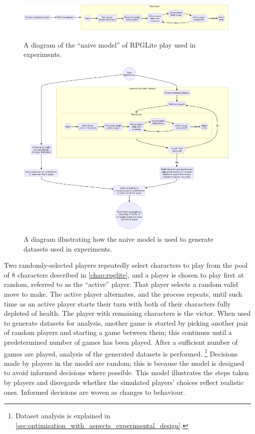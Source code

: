 \begin{figure}[tp]
  \centering
  \includegraphics[width=\columnwidth]{60_optimisation_with_aspects/diagrams/naive_model.png}
  \caption{A diagram of the ``naive model'' of RPGLite play used in experiments.}
  \label{fig:naive_model}

  \includegraphics[width=\columnwidth]{60_optimisation_with_aspects/diagrams/experiment_setup_for_datagen.png}
  \caption{A diagram illustrating how the naive model is used to generate datasets used in experiments.}
  \label{fig:naive_model_with_experimental_apparatus}
\end{figure}



Two randomly-selected players repeatedly select characters to play from the pool
of 8 characters described in \cref{chap:rpglite}, and a player is chosen to play
first at random, referred to as the ``active'' player. That player selects a
random valid move to make. The active player alternates, and the process
repeats, until such time as an active player starts their turn with both of
their characters fully depleted of health. The player with remaining characters
is the victor. When used to generate datasets for analysis, another game is
started by picking another pair of random players and starting a game between
them; this continues until a predetermined number of games has been played.
After a sufficient number of games are played, analysis of the generated datasets
is performed. \footnote{Dataset analysis is explained in
\cref{sec:optimisation_with_aspects_experimental_design}.}
Decisions made by players in the model are random; this is because the model is
designed to avoid informed decisions where possible. This model illustrates the
steps taken by players and disregards whether the simulated players' choices
reflect realistic ones. Informed decisions are woven as \aspectoriented{}
changes to behaviour.

